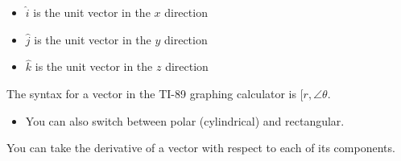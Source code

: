 \documentclass{scrreprt} %
\begin{document}
\begin{definition}
  \begin{itemize}
    \item $\hat{i}$ is the unit vector in the $x$ direction
    \item $\hat{j}$ is the unit vector in the $y$ direction
    \item $\hat{k}$ is the unit vector in the $z$ direction
  \end{itemize}
\end{definition}

\begin{remark}
  The syntax for a vector in the TI-89 graphing calculator is 
  $[r,\angle \theta $. 

  \begin{itemize}
    \item You can also switch between polar (cylindrical) and rectangular.
  \end{itemize}
\end{remark}

\begin{remark}
  You can take the derivative of a vector with respect to each of its components.
\end{remark}
\end{document}
